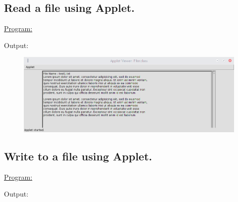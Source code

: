 \documentclass[a4paper,11pt]{article}
\begin{document}
\subsection{Read a file using Applet.}
\underline{Program:}



Output:
\begin{figure}[H]
\centering
\includegraphics[width=350pt,height=\textheight,keepaspectratio]{../assign2/pics/10.png}
\end{figure}

\bigskip

\subsection{Write to a file using Applet.}
\underline{Program:}


Output:
\begin{figure}[H]
\centering
\end{figure}

\bigskip
\end{document}
